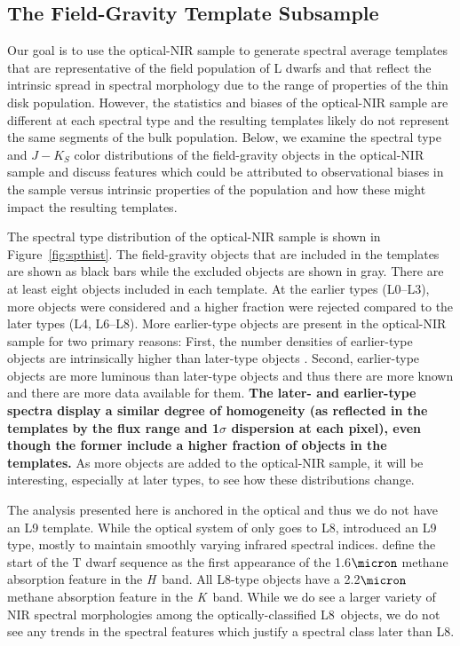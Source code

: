 \documentclass[12pt]{aastex6}
\begin{document}
\subsection{The Field-Gravity Template Subsample}
\label{sec:templates_normal}

Our goal is to use the optical-NIR sample to generate spectral average templates that are representative of the field population of L dwarfs and that reflect the intrinsic spread in spectral morphology due to the range of properties of the thin disk population.
However, the statistics and biases of the optical-NIR sample are different at each spectral type and the resulting templates likely do not represent the same segments of the bulk population.
Below, we examine the spectral type and $J-K_S$ color distributions of the field-gravity objects in the optical-NIR sample and discuss features which could be attributed to observational biases in the sample versus intrinsic properties of the population and how these might impact the resulting templates.

The spectral type distribution of the optical-NIR sample is shown in Figure~\ref{fig:spthist}.
The field-gravity objects that are included in the templates are shown as black bars while the excluded objects are shown in gray.
There are at least eight objects included in each template.
At the earlier types (L0--L3), more objects were considered and a higher fraction were rejected compared to the later types (L4, L6--L8).
More earlier-type objects are present in the optical-NIR sample for two primary reasons: First, the number densities of earlier-type objects are intrinsically higher than later-type objects \citep{Cruz03,Reid08,DayJones:2013hm}.
Second, earlier-type objects are more luminous than later-type objects and thus there are more known and there are more data available for them.
\textbf{The later- and earlier-type spectra display a similar degree of homogeneity (as reflected in the templates by the flux range and 1$\sigma$ dispersion at each pixel), even though the former include a higher fraction of objects in the templates.}
As more objects are added to the optical-NIR sample, it will be interesting, especially at later types, to see how these distributions change.

The analysis presented here is anchored in the optical and thus we do not have an L9 template.
While the optical system of \cite{K99} only goes to L8, \cite{Geballe02} introduced an L9 type, mostly to maintain smoothly varying infrared spectral indices.
\cite{Geballe02} define the start of the T dwarf sequence as the first appearance of the 1.6$\micron$ methane absorption feature in the \emph{H}~band.
All L8-type objects have a 2.2$\micron$ methane absorption feature in the \emph{K}~band.
While we do see a larger variety of NIR spectral morphologies among the optically-classified L8~objects, we do not see any trends in the spectral features which justify a spectral class later than L8.
\end{document}
